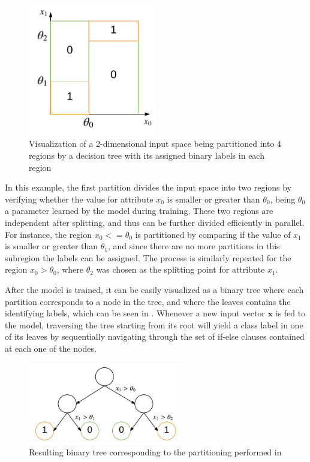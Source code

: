 \documentclass{kththesis}
\begin{document}
\begin{figure}[h]
    \centering
    \includegraphics[width=0.5\textwidth,keepaspectratio]{figures/dectree.pdf}
    \caption{Visualization of a 2-dimensional input space being partitioned into 4 regions by a decision tree with its assigned binary labels in each region}
    \label{fig:dectree}
\end{figure}

In this example, the first partition divides the input space into two regions by verifying whether the value for attribute $x_0$ is smaller or greater than $\theta_0$, being $\theta_0$ a parameter learned by the model during training. These two regions are independent after splitting, and thus can be further divided efficiently in parallel. For instance, the region $x_0 <= \theta_0$ is partitioned by comparing if the value of $x_1$ is smaller or greater than $\theta_1$, and since there are no more partitions in this subregion the labels can be assigned. The process is similarly repeated for the region  $x_0 > \theta_0$, where $\theta_2$ was chosen as the splitting point for attribute $x_1$.
 
After the model is trained, it can be easily visualized as a binary tree where each partition corresponds to a node in the tree, and where the leaves contains the identifying labels, which can be seen in . Whenever a new input vector $\mathbf{x}$ is fed to the model, traversing the tree starting from its root will yield a class label in one of its leaves by sequentially navigating through the set of if-else clauses contained at each one of the nodes.  
 
\begin{figure}[h]
    \centering
    \includegraphics[width=0.6\textwidth,keepaspectratio]{figures/dectree_bin.pdf}
    \caption{Resulting binary tree corresponding to the partitioning performed in }
    \label{fig:dectree_bin}
\end{figure}
 
\end{document}
